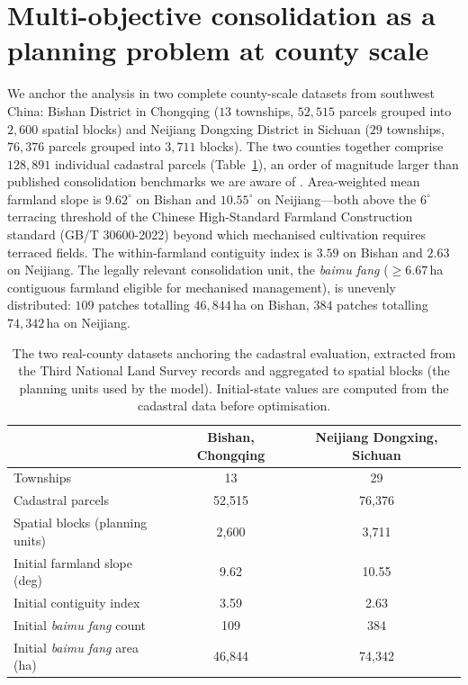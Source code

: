 \documentclass[11pt]{article}
\begin{document}
\section{Multi-objective consolidation as a planning problem at county scale}\label{sec:problem}

We anchor the analysis in two complete county-scale datasets from southwest China: Bishan District in Chongqing ($13$ townships, $52{,}515$ parcels grouped into $2{,}600$ spatial blocks) and Neijiang Dongxing District in Sichuan ($29$ townships, $76{,}376$ parcels grouped into $3{,}711$ blocks). The two counties together comprise $128{,}891$ individual cadastral parcels (Table~\ref{tab:counties}), an order of magnitude larger than published consolidation benchmarks we are aware of \citep{cao2012boundary,zheng2023urban}. Area-weighted mean farmland slope is $9.62^{\circ}$ on Bishan and $10.55^{\circ}$ on Neijiang---both above the $6^{\circ}$ terracing threshold of the Chinese High-Standard Farmland Construction standard (GB/T 30600-2022) beyond which mechanised cultivation requires terraced fields. The within-farmland contiguity index is $3.59$ on Bishan and $2.63$ on Neijiang. The legally relevant consolidation unit, the \textit{baimu fang} ($\geq 6.67$\,ha contiguous farmland eligible for mechanised management), is unevenly distributed: $109$ patches totalling $46{,}844$\,ha on Bishan, $384$ patches totalling $74{,}342$\,ha on Neijiang.

\begin{table}[htbp]
\centering
\small
\caption{The two real-county datasets anchoring the cadastral evaluation, extracted from the Third National Land Survey records and aggregated to spatial blocks (the planning units used by the model). Initial-state values are computed from the cadastral data before optimisation.}
\label{tab:counties}
\begin{tabular}{lcc}
\toprule
 & Bishan, Chongqing & Neijiang Dongxing, Sichuan \\
\midrule
Townships                                & 13       & 29       \\
Cadastral parcels                        & 52{,}515 & 76{,}376 \\
Spatial blocks (planning units)          & 2{,}600  & 3{,}711  \\
Initial farmland slope (deg)             & 9.62     & 10.55    \\
Initial contiguity index                 & 3.59     & 2.63     \\
Initial \textit{baimu fang} count        & 109      & 384      \\
Initial \textit{baimu fang} area (ha)    & 46{,}844 & 74{,}342 \\
\bottomrule
\end{tabular}
\end{table}
\end{document}
